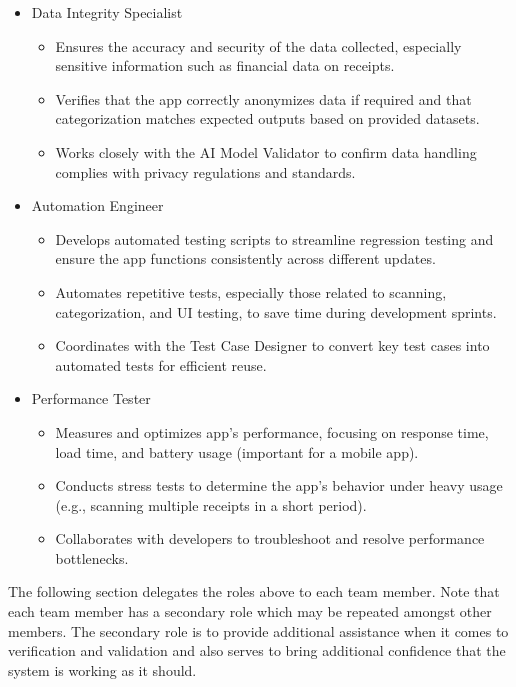 \documentclass[12pt, titlepage]{article}
\begin{document}
\begin{itemize}
	\item Data Integrity Specialist
	\begin{itemize}
		\item Ensures the accuracy and security of the data collected, especially sensitive information such as financial data on receipts.
		\item Verifies that the app correctly anonymizes data if required and that categorization matches expected outputs based on provided datasets.
		\item Works closely with the AI Model Validator to confirm data handling complies with privacy regulations and standards.
	\end{itemize}
	\item Automation Engineer
	\begin{itemize}
		\item Develops automated testing scripts to streamline regression testing and ensure the app functions consistently across different updates.
		\item Automates repetitive tests, especially those related to scanning, categorization, and UI testing, to save time during development sprints.
		\item Coordinates with the Test Case Designer to convert key test cases into automated tests for efficient reuse.
	\end{itemize}
	\item Performance Tester
	\begin{itemize}
		\item Measures and optimizes app's performance, focusing on response time, load time, and battery usage (important for a mobile app).
		\item Conducts stress tests to determine the app's behavior under heavy usage (e.g., scanning multiple receipts in a short period).
		\item Collaborates with developers to troubleshoot and resolve performance bottlenecks.
	\end{itemize}
\end{itemize}

\noindent The following section delegates the roles above to each team member. Note that each team member has a secondary role which may be repeated amongst other members. The secondary
role is to provide additional assistance when it comes to verification and validation and also serves to bring additional confidence that the system is working
as it should. \\
\end{document}
